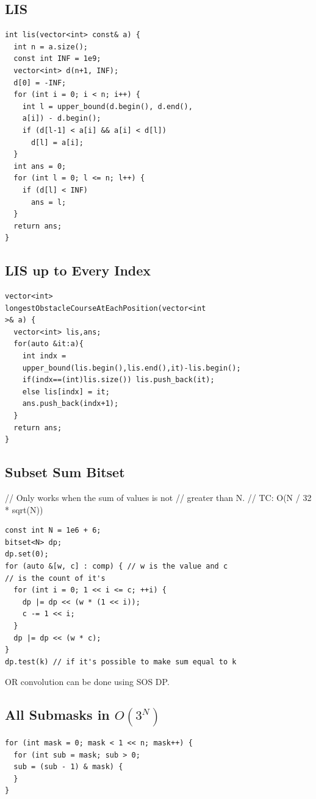 \subsection{LIS}
\begin{verbatim}
int lis(vector<int> const& a) {
  int n = a.size();
  const int INF = 1e9;
  vector<int> d(n+1, INF);
  d[0] = -INF;
  for (int i = 0; i < n; i++) {
    int l = upper_bound(d.begin(), d.end(),
    a[i]) - d.begin();
    if (d[l-1] < a[i] && a[i] < d[l])
      d[l] = a[i];
  }
  int ans = 0;
  for (int l = 0; l <= n; l++) {
    if (d[l] < INF)
      ans = l;
  }
  return ans;
}
\end{verbatim}
\subsection{LIS up to Every Index}
\begin{verbatim}
vector<int>
longestObstacleCourseAtEachPosition(vector<int
>& a) {
  vector<int> lis,ans;
  for(auto &it:a){
    int indx =
    upper_bound(lis.begin(),lis.end(),it)-lis.begin();
    if(indx==(int)lis.size()) lis.push_back(it);
    else lis[indx] = it;
    ans.push_back(indx+1);
  }
  return ans;
}
\end{verbatim}
\subsection{Subset Sum Bitset}
// Only works when the sum of values is not
// greater than N.
// TC: O(N / 32 * sqrt(N))
\begin{verbatim}
const int N = 1e6 + 6;
bitset<N> dp;
dp.set(0);
for (auto &[w, c] : comp) { // w is the value and c
// is the count of it's
  for (int i = 0; 1 << i <= c; ++i) {
    dp |= dp << (w * (1 << i));
    c -= 1 << i;
  }
  dp |= dp << (w * c);
}
dp.test(k) // if it's possible to make sum equal to k
\end{verbatim}

OR convolution can be done using SOS DP.
\subsection{All Submasks in \texorpdfstring{$O(3^N)$}{O(3^N)}}
\begin{verbatim}
for (int mask = 0; mask < 1 << n; mask++) {
  for (int sub = mask; sub > 0;
  sub = (sub - 1) & mask) {
  }
}
\end{verbatim}
